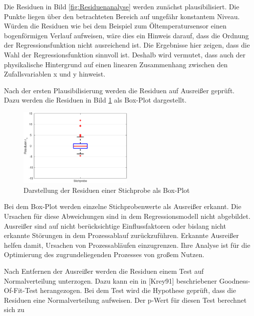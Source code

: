 \noindent Die Residuen in Bild \ref{fig:Residuenanalyse} werden zun\"{a}chst plausibilisiert. Die Punkte liegen \"{u}ber den betrachteten Bereich auf ungef\"{a}hr konstantem Niveau. W\"{u}rden die Residuen wie bei dem Beispiel zum \"{O}ltemperatursensor einen bogenf\"{o}rmigen Verlauf aufweisen, w\"{a}re dies ein Hinweis darauf, dass die Ordnung der Regressionsfunktion nicht ausreichend ist. Die Ergebnisse hier zeigen, dass die Wahl der Regressionsfunktion sinnvoll ist. Deshalb wird vermutet, dass auch der physikalische Hintergrund auf einen linearen Zusammenhang zwischen den Zufallsvariablen x und y hinweist.\newline

\noindent Nach der ersten Plausibilisierung werden die Residuen auf Ausrei{\ss}er gepr\"{u}ft. Dazu werden die Residuen in Bild \ref{fig:Residuenanalyse2} als Box-Plot dargestellt.

\noindent 
\begin{figure}[H]
  \centerline{\includegraphics[width=0.5\textwidth]{Kapitel12/Bilder/image15}}
  \caption{Darstellung der Residuen einer Stichprobe als Box-Plot}
  \label{fig:Residuenanalyse2}
\end{figure}

\noindent Bei dem Box-Plot werden einzelne Stichprobenwerte als Ausrei{\ss}er erkannt. Die Ursachen f\"{u}r diese Abweichungen sind in dem Regressionsmodell nicht abgebildet. Ausrei{\ss}er sind auf nicht ber\"{u}cksichtige Einflussfaktoren oder bislang nicht erkannte St\"{o}rungen in dem Prozessablauf zur\"{u}ckzuf\"{u}hren. Erkannte Ausrei{\ss}er helfen damit, Ursachen von Prozessabl\"{a}ufen einzugrenzen. Ihre Analyse ist f\"{u}r die Optimierung des zugrundeliegenden Prozesses von gro{\ss}em Nutzen.\newline

\noindent Nach Entfernen der Ausrei{\ss}er werden die Residuen einem Test auf Normalverteilung unterzogen. Dazu kann ein in [Krey91] beschriebener Goodness-Of-Fit-Test herangezogen. Bei dem Test wird die Hypothese gepr\"{u}ft, dass die Residuen eine Normalverteilung aufweisen. Der p-Wert f\"{u}r diesen Test berechnet sich zu

